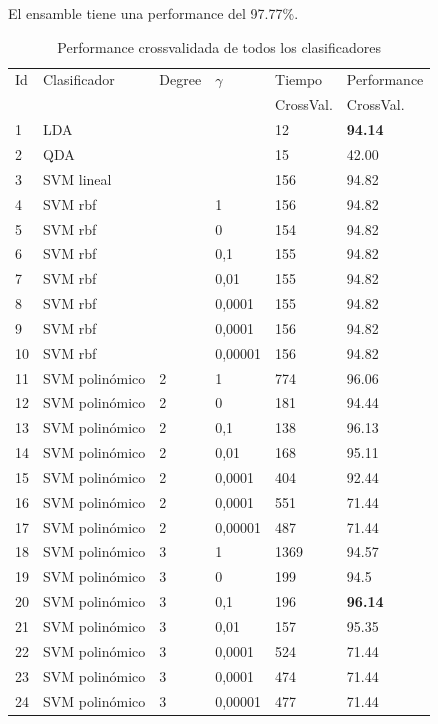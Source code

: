 \documentclass[journal]{IEEEtran}
\begin{document}
El ensamble tiene una performance del 97.77\%.

\begin{table}[!hb]
\caption{Performance crossvalidada de todos los clasificadores}
\label{table:main_results}
\centering
\begin{tabular}{l | l l l | l l}
Id	&	Clasificador	&	Degree	&    $\gamma$	&	Tiempo	&	Performance \\
	&			&		&		&	CrossVal.	&	CrossVal. \\
\hline
	1	&	LDA	&		&		&	12	&	\textbf{94.14} \\
\hline
	2	&	QDA	&		&		&	15	&	42.00 \\
\hline
	3	&	SVM lineal 	&		&		&	156	&	94.82 \\
	4	&	SVM rbf  	&		&	1	&	156	&	94.82 \\
	5	&	SVM rbf  	&		&	0	&	154	&	94.82 \\
	6	&	SVM rbf  	&		&	 0,1 	&	155	&	94.82 \\
	7	&	SVM rbf  	&		&	 0,01 	&	155	&	94.82 \\
	8	&	SVM rbf  	&		&	0,0001	&	155	&	94.82 \\
	9	&	SVM rbf  	&		&	 0,0001 	&	156	&	94.82 \\
	10	&	SVM rbf  	&		&	 0,00001 	&	156	&	94.82 \\
	11	&	SVM polinómico 	&	2	&	1	&	774	&	96.06 \\
	12	&	SVM polinómico 	&	2	&	0	&	181	&	94.44 \\
	13	&	SVM polinómico 	&	2	&	 0,1  	&	138	&	96.13 \\
	14	&	SVM polinómico 	&	2	&	 0,01  	&	168	&	95.11 \\
	15	&	SVM polinómico 	&	2	&	0,0001	&	404	&	92.44 \\
	16	&	SVM polinómico 	&	2	&	 0,0001  	&	551	&	71.44 \\
	17	&	SVM polinómico 	&	2	&	 0,00001  	&	487	&	71.44 \\
	18	&	SVM polinómico 	&	3	&	1	&	1369	&	94.57 \\
	19	&	SVM polinómico 	&	3	&	0	&	199	&	94.5 \\
	20	&	SVM polinómico 	&	3	&	 0,1  	&	196	&	\textbf{96.14} \\
	21	&	SVM polinómico 	&	3	&	 0,01  	&	157	&	95.35 \\
	22	&	SVM polinómico 	&	3	&	0,0001	&	524	&	71.44 \\
	23	&	SVM polinómico 	&	3	&	 0,0001  	&	474	&	71.44 \\
	24	&	SVM polinómico 	&	3	&	 0,00001  	&	477	&	71.44 \\

\end{tabular}
\end{table}
\end{document}
